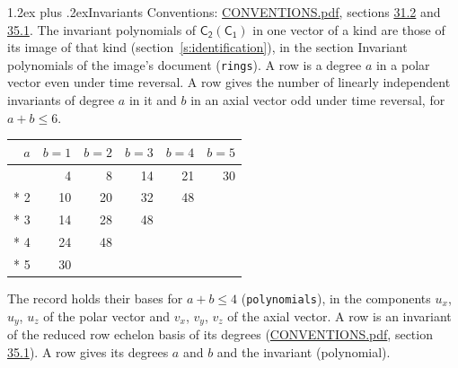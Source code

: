 \documentclass[10pt,a4paper]{article}
\makeatletter
\renewcommand\section{\@startsection{section}{1}{\z@}{-3ex plus -1ex minus -.2ex}%
  {1.2ex plus .2ex}{\normalfont\large\sffamily\bfseries\color{parttitle}}}
\numberwithin{equation}{section}
\newcommand{\grp}[1]{\mathsf{#1}}
\makeatother
\begin{document}
\section{Invariants}\label{s:invariants}
Conventions: \href{../../CONVENTIONS.pdf}{CONVENTIONS.pdf}, sections \href{../../CONVENTIONS.pdf\#conv.31.2}{31.2} and \href{../../CONVENTIONS.pdf\#conv.35.1}{35.1}.
The invariant polynomials of $\grp{C_{2}}(\grp{C_{1}})$ in one vector of a kind are those of its image of that kind (section~\ref{s:identification}), in the section Invariant polynomials of the image's document (\texttt{rings}).
\leavevmode\label{n:index.degree.polar}\label{n:index.degree.axial}A row is a degree $a$ in a polar vector even under time reversal. A row gives the number of linearly independent invariants of degree $a$ in it and $b$ in an axial vector odd under time reversal, for $a + b \le 6$.
{\small\begin{longtable}{@{}rrrrrr@{}}\toprule
$a$ & $b = 1$ & $b = 2$ & $b = 3$ & $b = 4$ & $b = 5$\\\midrule\endhead
\bottomrule\endfoot\endlastfoot
1 & 4 & 8 & 14 & 21 & 30\\*
2 & 10 & 20 & 32 & 48 & \\*
3 & 14 & 28 & 48 &  & \\*
4 & 24 & 48 &  &  & \\*
5 & 30 &  &  &  & \\
\bottomrule\end{longtable}}
\leavevmode\label{n:local.component.polar}\label{n:local.component.axial}The record holds their bases for $a + b \le 4$ (\texttt{polynomials}), in the components $u_{x}$, $u_{y}$, $u_{z}$ of the polar vector and $v_{x}$, $v_{y}$, $v_{z}$ of the axial vector. \label{n:head.polynomial}A row is an invariant of the reduced row echelon basis of its degrees (\href{../../CONVENTIONS.pdf}{CONVENTIONS.pdf}, section \href{../../CONVENTIONS.pdf\#conv.35.1}{35.1}). A row gives its degrees $a$ and $b$ and the invariant (polynomial).
\end{document}
